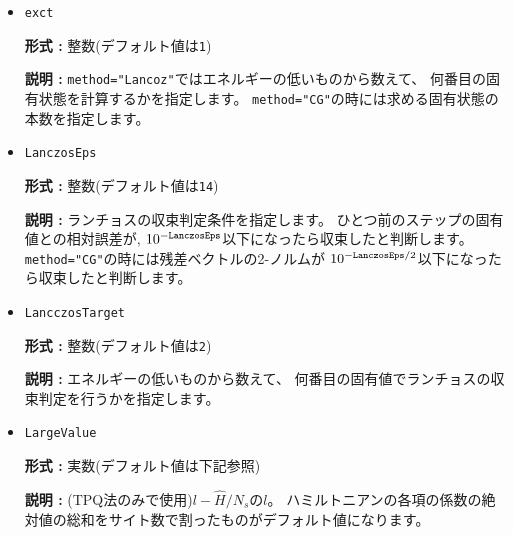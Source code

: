 \begin{itemize}



\item \verb|exct|

{\bf 形式 :} 整数(デフォルト値は\verb|1|)

{\bf 説明 :}
\verb|method="Lancoz"|ではエネルギーの低いものから数えて、
何番目の固有状態を計算するかを指定します。
\verb|method="CG"|の時には求める固有状態の本数を指定します。

\item \verb|LanczosEps|

{\bf 形式 :} 整数(デフォルト値は\verb|14|)

{\bf 説明 :} ランチョスの収束判定条件を指定します。
ひとつ前のステップの固有値との相対誤差が,
$10^{-{\tt LanczosEps}}$以下になったら収束したと判断します。
\verb|method="CG"|の時には残差ベクトルの2-ノルムが
$10^{-{\tt LanczosEps}/2}$以下になったら収束したと判断します。

\item \verb|LancczosTarget|

{\bf 形式 :} 整数(デフォルト値は\verb|2|)

{\bf 説明 :} エネルギーの低いものから数えて、
何番目の固有値でランチョスの収束判定を行うかを指定します。

\item \verb|LargeValue|

{\bf 形式 :} 実数(デフォルト値は下記参照)

{\bf 説明 :} (TPQ法のみで使用)$l-\hat{H}/N_{s}$の$l$。
ハミルトニアンの各項の係数の絶対値の総和をサイト数で割ったものがデフォルト値になります。






\end{itemize}

